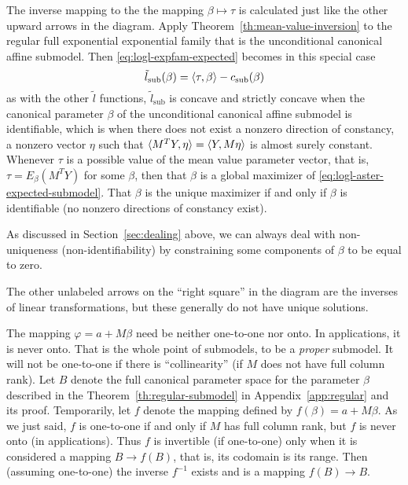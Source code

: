 The inverse mapping to the the mapping $\beta \mapsto \tau$ is calculated
just like the other upward arrows in the diagram.
Apply Theorem~\ref{th:mean-value-inversion} to the regular
full exponential exponential family that is
the unconditional canonical affine submodel.
Then \eqref{eq:logl-expfam-expected} becomes in this special case
\begin{equation} \label{eq:logl-aster-expected-submodel}
   \tilde{l}_\text{sub}(\beta) = \langle \tau, \beta \rangle - c_\text{sub}(\beta)
\end{equation}
as with the other $\tilde{l}$ functions, $\tilde{l}_\text{sub}$ is concave
and strictly concave when the canonical parameter $\beta$ of the unconditional
canonical affine submodel is identifiable, which is when there does not
exist a nonzero direction of constancy, a nonzero vector $\eta$ such that
$\langle M^T Y, \eta \rangle = \langle Y, M \eta \rangle$ is almost surely constant.
Whenever $\tau$ is a possible value of the mean value parameter vector,
that is, $\tau = E_\beta(M^T Y)$ for some $\beta$, then that $\beta$
is a global maximizer of \eqref{eq:logl-aster-expected-submodel}.
That $\beta$ is the unique maximizer if and only if $\beta$ is identifiable
(no nonzero directions of constancy exist).

As discussed in Section~\ref{sec:dealing} above, we can always deal with
non-uniqueness (non-identifiability) by constraining some components of
$\beta$ to be equal to zero.

The other unlabeled arrows on the ``right square'' in the diagram are the
inverses of linear transformations, but these generally do not have
unique solutions.

The mapping $\varphi = a + M \beta$ need be neither one-to-one nor onto.
In applications, it is never onto.  That is the whole point of submodels,
to be a \emph{proper} submodel.  It will not be one-to-one if there is
``collinearity'' (if $M$ does not have full column rank).  Let $B$ denote
the full canonical parameter space for the parameter $\beta$ described in
the Theorem~\ref{th:regular-submodel} in Appendix~\ref{app:regular} and its
proof.  Temporarily, let $f$ denote the mapping defined
by $f(\beta) = a + M \beta$.  As we just said, $f$ is one-to-one if and only
if $M$ has full column rank, but $f$ is never onto (in applications).
Thus $f$ is invertible (if one-to-one) only when it is considered a mapping
$B \to f(B)$, that is, its codomain is its range.  Then (assuming one-to-one)
the inverse $f^{-1}$ exists and is a mapping $f(B) \to B$.

